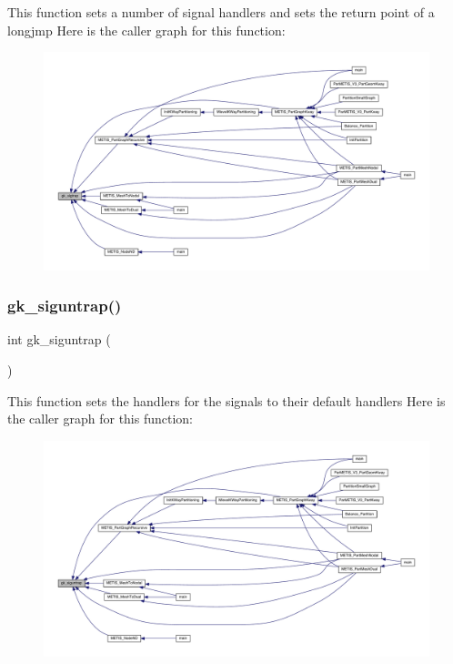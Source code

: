 This function sets a number of signal handlers and sets the return point of a longjmp Here is the caller graph for this function\+:\nopagebreak
\begin{figure}[H]
\begin{center}
\leavevmode
\includegraphics[width=350pt]{a00026_a05869524d1c30cfaab2a8690e7da6fd4_icgraph}
\end{center}
\end{figure}
\mbox{\label{a00026_a08f287b6dbdc0779c916ecbd49540a1e}} 
\subsubsection{\texorpdfstring{gk\+\_\+siguntrap()}{gk\_siguntrap()}}
{\footnotesize\ttfamily int gk\+\_\+siguntrap (\begin{DoxyParamCaption}{ }\end{DoxyParamCaption})}

This function sets the handlers for the signals to their default handlers Here is the caller graph for this function\+:\nopagebreak
\begin{figure}[H]
\begin{center}
\leavevmode
\includegraphics[width=350pt]{a00026_a08f287b6dbdc0779c916ecbd49540a1e_icgraph}
\end{center}
\end{figure}
\mbox{\label{a00026_a4e5e21eb7f29fcdabd4ef027223bbdf0}} 
